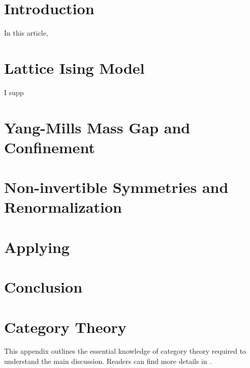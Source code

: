 \documentclass[a4paper,11pt]{article}
\theoremstyle{definition}
\begin{document}
\tableofcontents

\section{Introduction}
In this article, 

\section{Lattice Ising Model}
I supp

\section{Yang-Mills Mass Gap and Confinement}

\section{Non-invertible Symmetries and Renormalization}

\section{Applying }

\section{Conclusion}

\appendix
\section{Category Theory}
This appendix outlines the essential knowledge of category theory required to understand the main discussion. 
Readers can find more details in \cite{lane1998categories,riehl2017category}.\par
\end{document}
